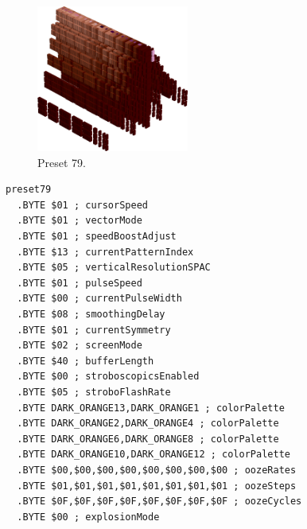 \begin{minipage}[b]{0.48\linewidth}
\begin{figure}[H]                                                          
  \centering                                                             
  \begin{adjustbox}{width=5cm,center}                                   
  \includegraphics[width=5cm]{src/colorspace_presets/preset79-45.png}%
  \end{adjustbox}                                                        
\caption*{Preset 79.}                                           
\end{figure}                                                               
\end{minipage}
\hspace{0.1cm}
\begin{minipage}[b]{0.48\linewidth}                                       
\begin{lstlisting}[basicstyle=\ttfamily\tiny]
preset79
  .BYTE $01 ; cursorSpeed
  .BYTE $01 ; vectorMode
  .BYTE $01 ; speedBoostAdjust
  .BYTE $13 ; currentPatternIndex
  .BYTE $05 ; verticalResolutionSPAC
  .BYTE $01 ; pulseSpeed
  .BYTE $00 ; currentPulseWidth
  .BYTE $08 ; smoothingDelay
  .BYTE $01 ; currentSymmetry
  .BYTE $02 ; screenMode
  .BYTE $40 ; bufferLength
  .BYTE $00 ; stroboscopicsEnabled
  .BYTE $05 ; stroboFlashRate
  .BYTE DARK_ORANGE13,DARK_ORANGE1 ; colorPalette
  .BYTE DARK_ORANGE2,DARK_ORANGE4 ; colorPalette
  .BYTE DARK_ORANGE6,DARK_ORANGE8 ; colorPalette
  .BYTE DARK_ORANGE10,DARK_ORANGE12 ; colorPalette
  .BYTE $00,$00,$00,$00,$00,$00,$00,$00 ; oozeRates
  .BYTE $01,$01,$01,$01,$01,$01,$01,$01 ; oozeSteps
  .BYTE $0F,$0F,$0F,$0F,$0F,$0F,$0F,$0F ; oozeCycles
  .BYTE $00 ; explosionMode
\end{lstlisting}
\end{minipage}

